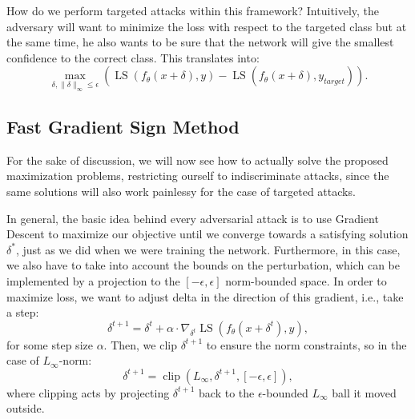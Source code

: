 \documentclass[LaM,binding=0.6cm]{./packages/sapthesis/sapthesis}
\begin{document}
        How do we perform targeted attacks within this framework? Intuitively, the adversary will want to minimize the loss with respect to the targeted class but at the same time, he also wants 
        to be sure that the network will give the smallest confidence to the correct class. This translates into:
        \begin{equation}
            \label{targetedattack}
            \displaystyle{\max_{\delta, \|\delta\|_{\infty} \leq \epsilon }  (\operatorname{LS}(f_{\theta}(x + \delta), y) - \operatorname{LS}(f_{\theta}(x + \delta), y_{target}) )  }.
        \end{equation} 

    \subsection{Fast Gradient Sign Method}

        For the sake of discussion, we will now see how to actually solve the proposed maximization problems, restricting ourself to indiscriminate attacks, since the same solutions will also
        work painlessy for the case of targeted attacks. 

        In general, the basic idea behind every adversarial attack is to use Gradient Descent to maximize our objective until we converge towards a satisfying solution $\delta^{*}$,
        just as we did when we were training the network. Furthermore, in this case, we also have to take into account the bounds on the perturbation, which can be implemented by a projection  
        to the $[-\epsilon, \epsilon]$ norm-bounded space. In order to maximize loss, we want to adjust delta in the direction of this gradient, i.e., take a step:
        \begin{equation}
            \label{pgd}
            \delta^{t+1} = \delta^t + \alpha \cdot \nabla_{\delta^t} \operatorname{LS}\left(f_{\theta}(x+\delta^t), y\right),
        \end{equation}
        for some step size $\alpha$. Then, we clip $\delta^{t+1}$ to ensure the norm constraints, so in the case of $L_{\infty}$-norm:
        \begin{equation}
            \delta^{t+1} = \operatorname{clip} (L_{\infty}, \delta^{t+1}, [-\epsilon, \epsilon]),
        \end{equation}
        where clipping acts by projecting $\delta^{t+1}$ back to the $\epsilon$-bounded $L_{\infty}$ ball it moved outside.
\end{document}
